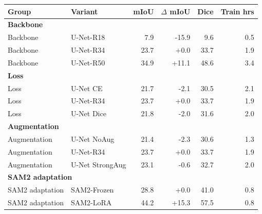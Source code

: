 \begin{tabular}{llrrrr}
\toprule
Group & Variant & mIoU & $\Delta$ mIoU & Dice & Train hrs \\
\midrule
\multicolumn{6}{l}{\textbf{Backbone}} \\
Backbone & U-Net-R18 & 7.9 & -15.9 & 9.6 & 0.5 \\
Backbone & U-Net-R34 & 23.7 & +0.0 & 33.7 & 1.9 \\
Backbone & U-Net-R50 & 34.9 & +11.1 & 48.6 & 3.4 \\
\midrule
\multicolumn{6}{l}{\textbf{Loss}} \\
Loss & U-Net CE & 21.7 & -2.1 & 30.5 & 2.1 \\
Loss & U-Net-R34 & 23.7 & +0.0 & 33.7 & 1.9 \\
Loss & U-Net Dice & 21.8 & -2.0 & 31.6 & 2.0 \\
\midrule
\multicolumn{6}{l}{\textbf{Augmentation}} \\
Augmentation & U-Net NoAug & 21.4 & -2.3 & 30.6 & 1.3 \\
Augmentation & U-Net-R34 & 23.7 & +0.0 & 33.7 & 1.9 \\
Augmentation & U-Net StrongAug & 23.1 & -0.6 & 32.7 & 2.0 \\
\midrule
\multicolumn{6}{l}{\textbf{SAM2 adaptation}} \\
SAM2 adaptation & SAM2-Frozen & 28.8 & +0.0 & 41.0 & 0.8 \\
SAM2 adaptation & SAM2-LoRA & 44.2 & +15.3 & 57.5 & 0.8 \\
\bottomrule
\end{tabular}
